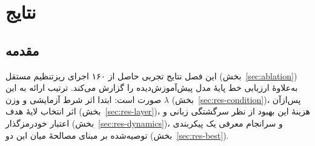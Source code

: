 
\chapter{نتایج}
\label{ch:results}

\section{مقدمه}
این فصل نتایج تجربی حاصل از ۱۶۰ اجرای ریزتنظیم مستقل (بخش~\ref{sec:ablation}) به‌علاوهٔ ارزیابی خط پایهٔ مدل پیش‌آموزش‌دیده را گزارش می‌کند. ترتیب ارائه به این صورت است: ابتدا اثر شرط آزمایشی و وزن
$\lambda$ (بخش~\ref{sec:res-condition})، پس‌ازآن اثر انتخاب لایهٔ هدف (بخش~\ref{sec:res-layer})، هزینهٔ این بهبود از نظر سرگشتگی زبانی و اعتبار خودرمزگذار (بخش~\ref{sec:res-dynamics})، و سرانجام معرفی یک پیکربندی توصیه‌شده بر مبنای مصالحهٔ میان این دو (بخش~\ref{sec:res-best}).




